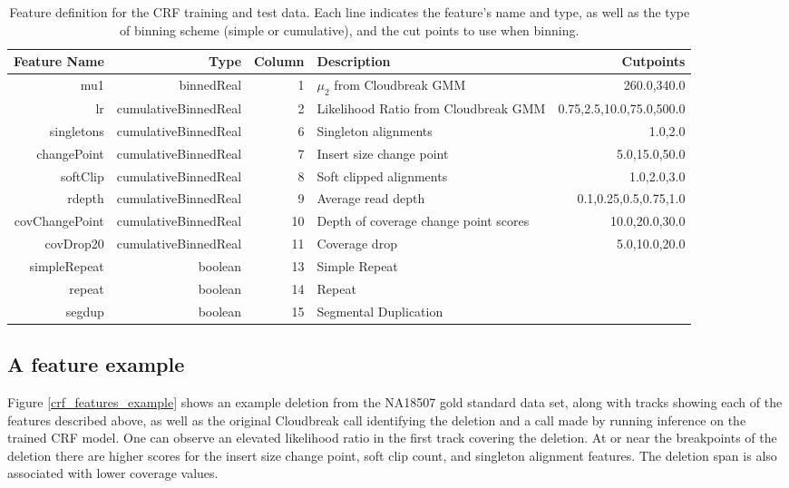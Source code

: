 \begin{table}
\begin{center}
\footnotesize
\begin{tabular}{rrrp{3.5cm}r}
 \hline
Feature Name & Type & Column & Description & Cutpoints \\
 \hline
 mu1 & binnedReal & 1 & $\mu_2$ from Cloudbreak GMM  &  260.0,340.0 \\
 lr &  cumulativeBinnedReal  &  2   & Likelihood Ratio from Cloudbreak GMM &  0.75,2.5,10.0,75.0,500.0 \\
 singletons & cumulativeBinnedReal &  6  & Singleton alignments  &  1.0,2.0 \\
 changePoint & cumulativeBinnedReal & 7 & Insert size change point & 5.0,15.0,50.0 \\
 softClip & cumulativeBinnedReal & 8 & Soft clipped alignments &  1.0,2.0,3.0 \\
 rdepth & cumulativeBinnedReal & 9 & Average read depth & 0.1,0.25,0.5,0.75,1.0 \\
 covChangePoint & cumulativeBinnedReal &  10 & Depth of coverage change point scores &  10.0,20.0,30.0 \\
 covDrop20 &  cumulativeBinnedReal  &  11 & Coverage drop &  5.0,10.0,20.0 \\
 simpleRepeat & boolean &  13  & Simple Repeat & \\
 repeat & boolean &  14  & Repeat & \\
 segdup & boolean &  15  &  Segmental Duplication & \\
 \hline
\end{tabular}
\end{center}
\caption[Feature definition for the CRF training and test data.]{Feature definition for the CRF training and test data. Each line indicates the feature's name and type, as well as the type of binning scheme (simple or cumulative), and the cut points to use when binning.}
\label{crf_feature_definitions}
\end{table}

\subsection{A feature example}

Figure \ref{crf_features_example} shows an example deletion from the NA18507 gold standard data set, along with tracks showing each of the features described above, as well as the original Cloudbreak call identifying the deletion and a call made by running inference on the trained CRF model. One can observe an elevated likelihood ratio in the first track covering the deletion. At or near the breakpoints of the deletion there are higher scores for the insert size change point, soft clip count, and singleton alignment features. The deletion span is also associated with lower coverage values.

